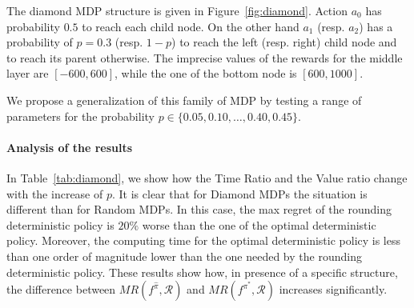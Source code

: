 

The diamond MDP structure is given in Figure~\ref{fig:diamond}. Action $a_0$ has probability $0.5$ to reach each child node.  
On the other hand $a_1$ (resp. $a_2$) has a probability of $p= 0.3$ (resp. $1-p$) to reach the left (resp. right) child node and to reach its parent otherwise.
The imprecise values of the rewards for the middle layer are $[-600,600]$, while the one of the bottom node is $[600,1000]$.

We propose a generalization of this family of MDP by testing a range of parameters for the probability $p \in \{0.05,0.10,\dots,0.40,0.45\}$. %

\paragraph{Analysis of the results}
In Table~\ref{tab:diamond}, we show how the Time Ratio and the Value ratio change with the increase of $p$.
It is clear that for Diamond MDPs the situation is different than for Random MDPs. In this case, the max regret of the rounding deterministic policy is $20\%$ worse than the one of the optimal deterministic policy. Moreover, the computing time for the optimal deterministic policy is less than one order of magnitude lower than the one needed by the rounding deterministic policy. These results show how, in presence of a specific structure, the difference between $MR(f^{\hat{\pi}}, \mathcal{R})$ and $MR(f^{\pi^*}, \mathcal{R})$ increases significantly.


